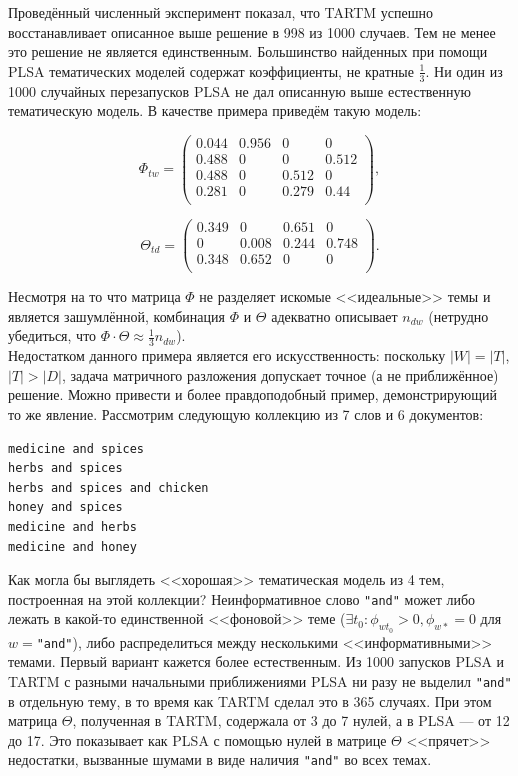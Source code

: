 Проведённый численный эксперимент показал, что TARTM успешно восстанавливает описанное выше решение в 998 из 1000 случаев. Тем не менее это решение не является единственным. Большинство найденных при помощи PLSA тематических моделей содержат коэффициенты, не кратные $\frac1{3}$. Ни один из 1000 случайных перезапусков PLSA не дал описанную выше естественную тематическую модель. В качестве примера приведём такую модель:

\[
\Phi_{tw} =
\begin{pmatrix}
    0.044 & 0.956 & 0 & 0 \\
    0.488 & 0 &  0 & 0.512 \\
    0.488 & 0 & 0.512 & 0 \\
    0.281 & 0 & 0.279 & 0.44 \\
\end{pmatrix},
\]

\[
\Theta_{td} =
\begin{pmatrix}
    0.349 & 0 & 0.651 & 0 \\
    0 & 0.008 & 0.244 & 0.748 \\
    0.348 & 0.652 & 0 & 0 \\
\end{pmatrix}.
\]

Несмотря на то что матрица $\Phi$ не разделяет искомые <<идеальные>> темы и является зашумлённой, комбинация $\Phi$ и $\Theta$ адекватно описывает $n_{dw}$ (нетрудно убедиться, что $\Phi \cdot \Theta \approx \frac{1}{3} n_{dw}$).\\

Недостатком данного примера является его искусственность: поскольку $|W|=|T|$, $|T|>|D|$, задача матричного разложения допускает точное (а не приближённое) решение. Можно привести и более правдоподобный пример, демонстрирующий то же явление. Рассмотрим следующую коллекцию из 7 слов и 6 документов:

\begin{verbatim}
medicine and spices
herbs and spices
herbs and spices and chicken
honey and spices
medicine and herbs
medicine and honey
\end{verbatim}

Как могла бы выглядеть <<хорошая>> тематическая модель из 4 тем, построенная на этой коллекции? Неинформативное слово \texttt{"and"} может либо лежать в какой-то единственной <<фоновой>> теме ($\exists t_0: \phi_{wt_0} > 0, \phi_{w\ast} = 0$ для $w=$\texttt{"and"}), либо распределиться между несколькими <<информативными>> темами. Первый вариант кажется более естественным. Из 1000 запусков PLSA и TARTM с разными начальными приближениями PLSA ни разу не выделил \texttt{"and"} в отдельную тему, в то время как TARTM сделал это в 365 случаях. При этом матрица $\Theta$, полученная в TARTM, содержала от 3 до 7 нулей, а в PLSA --- от 12 до 17. Это показывает как PLSA с помощью нулей в матрице $\Theta$ <<прячет>> недостатки, вызванные шумами в виде наличия \texttt{"and"} во всех темах.

